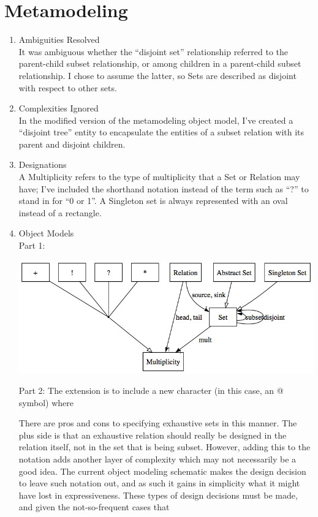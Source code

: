 \documentclass[11pt,letterpaper]{article}
\begin{document}
\section{Metamodeling}
\begin{enumerate}
\item Ambiguities Resolved\\
It was ambiguous whether the ``disjoint set'' relationship referred to the parent-child subset relationship, or among children in a parent-child subset relationship. I chose to assume the latter, so Sets are described as disjoint with respect to other sets.

\item Complexities Ignored\\
In the modified version of the metamodeling object model, I've created a ``disjoint tree'' entity to encapsulate the entities of a subset relation with its parent and disjoint children.
\item Designations\\
A Multiplicity refers to the type of multiplicity that a Set or Relation may have; I've included the shorthand notation instead of the term such as ``?'' to stand in for ``0 or 1''.
A Singleton set is always represented with an oval instead of a rectangle.
\item Object Models\\
Part 1:
\begin{center}
\includegraphics[width=400pt]{dot/metamodeling.png}
\label{fig:ob7} 
\end{center}

Part 2:
The extension is to include a new character (in this case, an @ symbol) where

There are pros and cons to specifying exhaustive sets in this manner. The plus side is that an exhaustive relation should really be designed in the relation itself, not in the set that is being subset. However, adding this to the notation adds another layer of complexity which may not necessarily be a good idea. The current object modeling schematic makes the design decision to leave such notation out, and as such it gains in simplicity what it might have lost in expressiveness. These types of design decisions must be made, and given the not-so-frequent cases that 


\end{enumerate}
\end{document}
